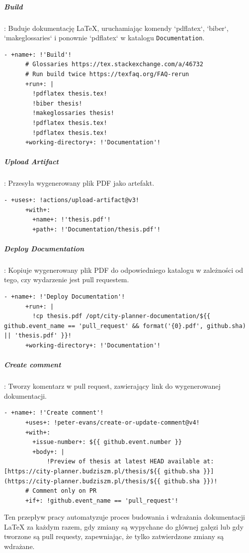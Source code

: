 \subparagraph{Build}: Buduje dokumentację LaTeX, uruchamiając komendy `pdflatex`, `biber`, `makeglossaries` i ponownie `pdflatex` w katalogu \texttt{\textcolor{codeblue}{Documentation}}.
\begin{lstlisting}[style=yaml-colored]
    - +name+: !'Build'!
      # Glossaries https://tex.stackexchange.com/a/46732
      # Run build twice https://texfaq.org/FAQ-rerun
      +run+: |
        !pdflatex thesis.tex!
        !biber thesis!
        !makeglossaries thesis!
        !pdflatex thesis.tex!
        !pdflatex thesis.tex!
      +working-directory+: !'Documentation'!
\end{lstlisting}

\subparagraph{Upload Artifact}: Przesyła wygenerowany plik PDF jako artefakt.
\begin{lstlisting}[style=yaml-colored]
    - +uses+: !actions/upload-artifact@v3!
      +with+:
        +name+: !'thesis.pdf'!
        +path+: !'Documentation/thesis.pdf'!
\end{lstlisting}

\subparagraph{Deploy Documentation}: Kopiuje wygenerowany plik PDF do odpowiedniego katalogu w zależności od tego, czy wydarzenie jest pull requestem.
\begin{lstlisting}[style=yaml-colored]
    - +name+: !'Deploy Documentation'!
      +run+: |
        !cp thesis.pdf /opt/city-planner-documentation/${{ github.event_name == 'pull_request' && format('{0}.pdf', github.sha) || 'thesis.pdf' }}!
      +working-directory+: !'Documentation'!
\end{lstlisting}

\subparagraph{Create comment}: Tworzy komentarz w pull request, zawierający link do wygenerowanej dokumentacji.
\begin{lstlisting}[style=yaml-colored]
    - +name+: !'Create comment'!
      +uses+: !peter-evans/create-or-update-comment@v4!
      +with+:
        +issue-number+: ${{ github.event.number }}
        +body+: |
            !Preview of thesis at latest HEAD available at: [https://city-planner.budziszm.pl/thesis/${{ github.sha }}](https://city-planner.budziszm.pl/thesis/${{ github.sha }})!
      # Comment only on PR
      +if+: !github.event_name == 'pull_request'!
\end{lstlisting}

Ten przepływ pracy automatyzuje proces budowania i wdrażania dokumentacji LaTeX za każdym razem, gdy zmiany są wypychane do głównej gałęzi lub gdy tworzone są pull requesty, zapewniając, że tylko zatwierdzone zmiany są wdrażane.

